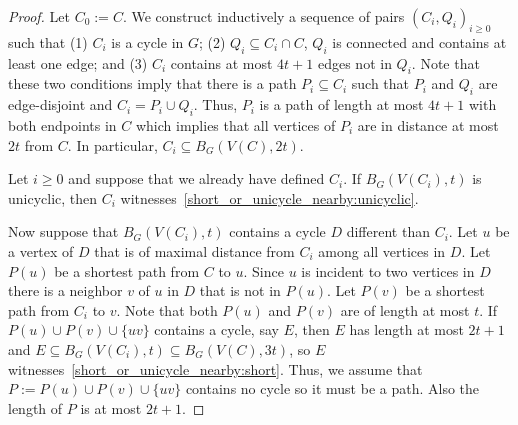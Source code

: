 \documentclass{patmorin}
\begin{document}
\begin{proof}
  Let $C_0:=C$.
  We construct inductively a sequence of pairs $(C_i,Q_i)_{i\geq0}$ such that
  (1) $C_i$ is a cycle in $G$;
  (2) $Q_i\subseteq C_i\cap C$, $Q_i$ is connected and contains at least one edge; and
  (3) $C_i$ contains at most $4t+1$ edges not in $Q_i$.
  Note that these two conditions imply that there is a path $P_i\subseteq C_i$  such that
  $P_i$ and $Q_i$ are edge-disjoint and $C_i=P_i\cup Q_i$.
  Thus, $P_i$ is a path of length at most $4t+1$ with both endpoints in $C$
  which implies that all vertices of $P_i$ are in distance at most $2t$ from $C$.
  In particular, $C_i\subseteq B_G(V(C),2t)$.

  Let $i\geq0$ and suppose that we already have defined $C_i$.
  If $B_G(V(C_i),t)$ is unicyclic, then $C_i$ witnesses~\eqref{short_or_unicycle_nearby:unicyclic}.

  Now suppose that $B_G(V(C_i),t)$ contains a cycle $D$ different than $C_i$.
  Let $u$ be a vertex of $D$ that is of maximal distance from $C_i$ among all vertices in $D$.
  Let $P(u)$ be a shortest path from $C$ to $u$.
  Since $u$ is incident to two vertices in $D$ there is a neighbor $v$ of $u$ in $D$ that is not in $P(u)$.
  Let $P(v)$ be a shortest path from $C_i$ to $v$.
  Note that both $P(u)$ and $P(v)$ are of length at most $t$.
  If $P(u)\cup P(v)\cup\{uv\}$ contains a cycle, say $E$, then $E$ has length at most $2t+1$ and $E\subseteq B_G(V(C_i),t)\subseteq B_G(V(C),3t)$, so $E$ witnesses~\eqref{short_or_unicycle_nearby:short}.
  Thus, we assume that $P:=P(u)\cup P(v)\cup\{uv\}$ contains no cycle so it must be a path.
  Also the length of $P$ is at most $2t+1$.


\end{proof}
\end{document}
